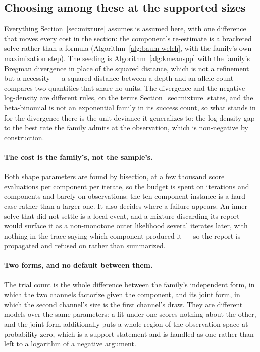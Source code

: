 \documentclass[11pt,a4paper]{article}
\begin{document}
\subsection{Choosing among these at the supported sizes}
\label{sec:emissionmixture:discussion}
Everything Section~\ref{sec:mixture} assumes is assumed here, with one
difference that moves every cost in the section: the component's
re-estimate is a bracketed solve rather than a formula
(Algorithm~\ref{alg:baum-welch}, with the family's own maximization step).
The seeding is Algorithm~\ref{alg:kmeanspp} with the family's Bregman
divergence in place of the squared distance, which is not a refinement but
a necessity --- a squared distance between a depth and an allele count
compares two quantities that share no units. The divergence and the negative
log-density are different rules, on the terms Section~\ref{sec:mixture}
states, and the beta-binomial is not an exponential family in its success
count, so what stands in for the divergence there is the unit deviance it
generalizes to: the log-density gap to the best rate the family admits at the
observation, which is non-negative by construction.

\paragraph{The cost is the family's, not the sample's.}
Both shape parameters are found by bisection, at a few thousand score
evaluations per component per iterate, so the budget is spent on iterations and
components and barely on observations: the ten-component instance is a hard
case rather than a larger one. It also decides where a failure appears. An
inner solve that did not settle is a local event, and a mixture discarding its
report would surface it as a non-monotone outer likelihood several iterates
later, with nothing in the trace saying which component produced it --- so the
report is propagated and refused on rather than summarized.

\paragraph{Two forms, and no default between them.}
The trial count is the whole difference between the family's independent
form, in which the two channels factorize given the component, and its joint
form, in which the second channel's size is the first channel's draw. They
are different models over the same parameters: a fit under one scores
nothing about the other, and the joint form additionally puts a whole region
of the observation space at probability zero, which is a support statement
and is handled as one rather than left to a logarithm of a negative
argument.
\end{document}
